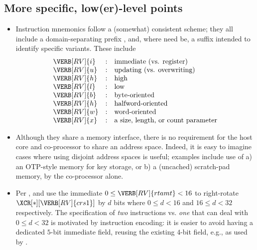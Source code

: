 
\subsection{More specific,  low(er)-level points}
\label{appx:discuss:lo}

\begin{itemize}

\item Instruction mnemonics follow a (somewhat) consistent scheme; they
      all include a domain-separating prefix , and, where
      need be, a suffix intended to identify specific variants.  These 
      include
      \[
      \begin{array}{lcl}
      \VERB[RV]{i} &:& \mbox{immediate (vs. register)   }        \\
      \VERB[RV]{u} &:& \mbox{updating  (vs. overwriting)}        \\
      \VERB[RV]{h} &:& \mbox{high}                               \\
      \VERB[RV]{l} &:& \mbox {low}                               \\
      \VERB[RV]{b} &:& \mbox    {byte-oriented}                  \\
      \VERB[RV]{h} &:& \mbox{halfword-oriented}                  \\
      \VERB[RV]{w} &:& \mbox    {word-oriented}                  \\
      \VERB[RV]{x} &:& \mbox{a size, length, or count parameter} \\
      \end{array}
      \]
\item Although they share a memory interface, there is no requirement for
      the host core and co-processor to share an address space.  Indeed,
      it is easy to imagine cases where using disjoint address spaces is
      useful; examples include use of
      a) an OTP-style memory for key storage, 
         or
      b) a (uncached) scratch-pad memory,
      by the co-processor alone.
\item Per , 
      and
      use the immediate 
      $ 
      0 \leq \VERB[RV]{rtamt} < 16 
      $ 
      to right-rotate $\XCR[*][{\VERB[RV]{crs1}}]$ by $d$ bits where
      $0  \leq d < 16$
      and
      $16 \leq d < 32$
      respectively.
      The specification of {\em two} instructions vs. {\em one} that can
      deal with 
      $0  \leq d < 32$
      is motivated by instruction encoding: it is easier to avoid having
      a dedicated $5$-bit immediate field, reusing the existing $4$-bit
      field, e.g., as used by
      .

\end{itemize}

